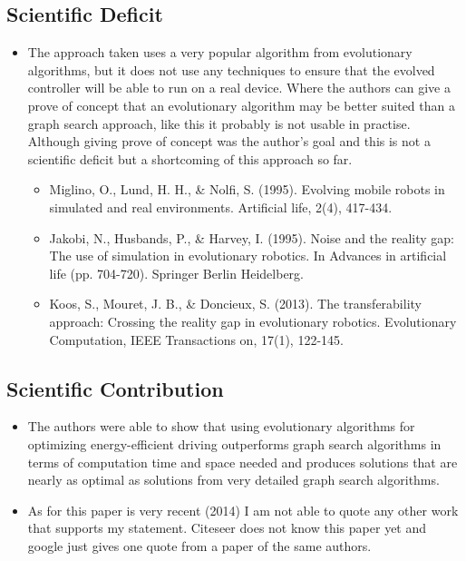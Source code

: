 \documentclass[paper=a4, fontsize=11pt]{scrartcl} %
\numberwithin{equation}{section} %
\numberwithin{figure}{section} %
\numberwithin{table}{section} %
\begin{document}
\subsection{Scientific Deficit}
\begin{itemize}
	\item The approach taken uses a very popular algorithm from evolutionary algorithms, but it does not use any techniques to ensure that the evolved controller will be able to run on a real device. Where the authors can give a prove of concept that an evolutionary algorithm may be better suited than a graph search approach, like this it probably is not usable in practise. Although giving prove of concept was the author's goal and this is not a scientific deficit but a shortcoming of this approach so far. 
	\begin{itemize}
		\item Miglino, O., Lund, H. H., \& Nolfi, S. (1995). Evolving mobile robots in simulated and real environments. Artificial life, 2(4), 417-434.
	\item Jakobi, N., Husbands, P., \& Harvey, I. (1995). Noise and the reality gap: The use of simulation in evolutionary robotics. In Advances in artificial life (pp. 704-720). Springer Berlin Heidelberg.
	\item Koos, S., Mouret, J. B., \& Doncieux, S. (2013). The transferability approach: Crossing the reality gap in evolutionary robotics. Evolutionary Computation, IEEE Transactions on, 17(1), 122-145.
	\end{itemize}
\end{itemize}

\subsection{Scientific Contribution}
\begin{itemize}
	\item The authors were able to show that using evolutionary algorithms for optimizing energy-efficient driving outperforms graph search algorithms in terms of computation time and space needed and produces solutions that are nearly as optimal as solutions from very detailed graph search algorithms.
	\item As for this paper is very recent (2014) I am not able to quote any other work that supports my statement. Citeseer does not know this paper yet and google just gives one quote from a paper of the same authors.
\end{itemize}
\end{document}
